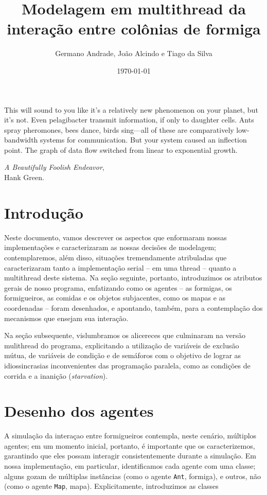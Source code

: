 \documentclass[12pt]{article}
\title{Modelagem em multithread da interação entre colônias de formiga}
\author{Germano Andrade, João Alcindo e Tiago da Silva}
\date{\today}
\theoremstyle{definition}
\begin{document}
  
	 
\maketitle  
\setlength{\epigraphwidth}{.9\textwidth} 
\epigraph{This will sound to you like it’s a relatively new phenomenon on your
planet, but it’s not. Even pelagibacter transmit information, if only to
daughter cells. Ants spray pheromones, bees dance, birds sing—all of these
are comparatively low-bandwidth systems for communication. But your
system caused an inflection point. The graph of data flow switched from
linear to exponential growth.}{\emph{A Beautifully Foolish Endeavor}, \\ Hank Green.} 

\tableofcontents 

\section{Introdução} 

Neste documento, vamos descrever os aspectos que enformaram nossas implementações e caracterizaram as nossas decisões de modelagem; contemplaremos, além disso, situações tremendamente atribuladas que caracterizaram tanto a implementação serial -- em uma thread -- quanto a multithread deste sistema. Na seção seguinte, portanto, introduzimos os atributos gerais de nosso programa, enfatizando como os agentes -- as formigas, os formigueiros, as comidas e os objetos subjacentes, como os mapas e as coordenadas -- foram desenhados, e apontando, também, para a contemplação dos mecanismos que ensejam sua interação. 

Na seção subsequente, vislumbramos os alicereces que culminaram na versão mulithread do programa, explicitando a utilização de variáveis de exclusão mútua, de variáveis de condição e de semáforos com o objetivo de lograr as idiossincrasias inconvenientes das programação paralela, como as condições de corrida e a inanição (\textit{starvation}). 

\section{Desenho dos agentes} 

A simulação da interaçao entre formigueiros contempla, neste cenário, múltiplos agentes; em um momento inicial, portanto, é importante que os caracterizemos, garantindo que eles possam interagir consistentemente durante a simulação. Em nossa implementação, em particular, identificamos cada agente com uma classe; alguns gozam de múltiplas instâncias (como o agente \texttt{Ant}, formiga), e outros, não (como o agente \texttt{Map}, mapa). Explicitamente, introduzimos as classes 
\end{document}

